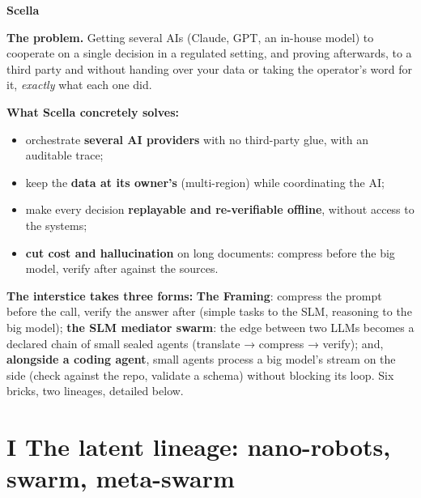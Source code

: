 \documentclass[11pt]{article}
\begin{document}
\begin{center}
{\Huge\bfseries\color{efenavy} Scella}
\end{center}
\vspace{6pt}

\begin{these}
\textbf{The problem.} Getting several AIs (Claude, GPT, an in-house model) to cooperate on a single
decision in a regulated setting, and proving afterwards, to a third party and without handing over your data or taking the operator's word for it, \emph{exactly} what each one did.

\textbf{What Scella concretely solves:}
\begin{itemize}[leftmargin=1.3em,itemsep=1.5pt,topsep=2pt,parsep=0pt,label=\textendash]
\item orchestrate \textbf{several AI providers} with no third-party glue, with an auditable trace;
\item keep the \textbf{data at its owner's} (multi-region) while coordinating the AI;
\item make every decision \textbf{replayable and re-verifiable offline}, without access to the systems;
\item \textbf{cut cost and hallucination} on long documents: compress before the big model, verify
after against the sources.
\end{itemize}
\vspace{2pt}
\textbf{The interstice takes three forms:} \textbf{The Framing}: compress the prompt before the call,
verify the answer after (simple tasks to the SLM, reasoning to the big model); \textbf{the SLM
mediator swarm}: the edge between two LLMs becomes a declared chain of small sealed agents
(translate → compress → verify); and, \textbf{alongside a coding agent}, small agents process a big
model's stream on the side (check against the repo, validate a schema) without blocking its loop.
Six bricks, two lineages, detailed below.
\end{these}

\section{I \;\textbar\; The latent lineage: nano-robots, swarm, meta-swarm}
\end{document}
